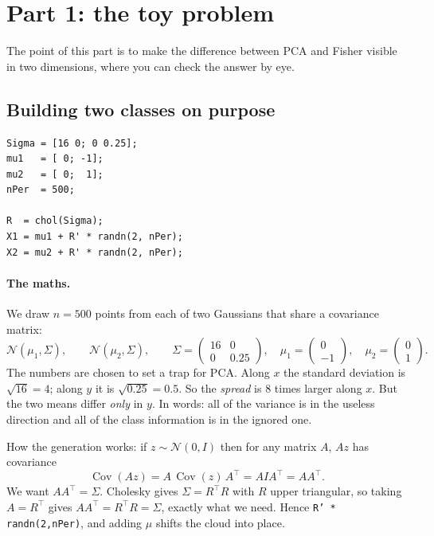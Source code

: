 \section{Part 1: the toy problem}

The point of this part is to make the difference between PCA and Fisher
visible in two dimensions, where you can check the answer by eye.

\subsection{Building two classes on purpose}

\begin{lstlisting}
Sigma = [16 0; 0 0.25];
mu1   = [ 0; -1];
mu2   = [ 0;  1];
nPer  = 500;

R  = chol(Sigma);
X1 = mu1 + R' * randn(2, nPer);
X2 = mu2 + R' * randn(2, nPer);
\end{lstlisting}

\paragraph{The maths.} We draw $n=500$ points from each of two Gaussians that
share a covariance matrix:
\[
  \mathcal{N}(\mu_1, \Sigma), \qquad \mathcal{N}(\mu_2, \Sigma), \qquad
  \Sigma = \begin{pmatrix} 16 & 0 \\ 0 & 0.25\end{pmatrix}, \quad
  \mu_1 = \begin{pmatrix}0\\-1\end{pmatrix}, \quad
  \mu_2 = \begin{pmatrix}0\\ 1\end{pmatrix}.
\]
The numbers are chosen to set a trap for PCA. Along $x$ the standard deviation
is $\sqrt{16}=4$; along $y$ it is $\sqrt{0.25}=0.5$. So the \emph{spread} is
$8$ times larger along $x$. But the two means differ \emph{only} in $y$. In
words: all of the variance is in the useless direction and all of the class
information is in the ignored one.

How the generation works: if $z \sim \mathcal{N}(0, I)$ then for any matrix $A$,
$Az$ has covariance
\[
  \operatorname{Cov}(Az) = A\,\operatorname{Cov}(z)\,A^{\!\top} = A I A^{\!\top} = AA^{\!\top}.
\]
We want $AA^{\!\top} = \Sigma$. Cholesky gives $\Sigma = R^{\!\top}R$ with $R$
upper triangular, so taking $A = R^{\!\top}$ gives
$AA^{\!\top} = R^{\!\top}R = \Sigma$, exactly what we need. Hence
\texttt{R' * randn(2,nPer)}, and adding $\mu$ shifts the cloud into place.

